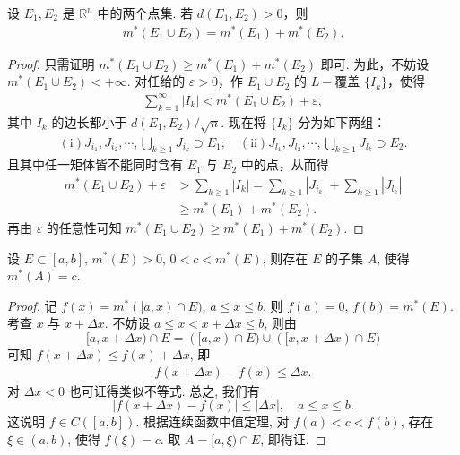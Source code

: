 \documentclass[../../main.tex]{subfiles}
\begin{document}
\begin{theorem}
设 \(E_1, E_2\) 是 \(\mathbb{R}^n\) 中的两个点集. 若 \(d(E_1, E_2)>0\)，则
\begin{align*}
m^*(E_1 \cup E_2) = m^*(E_1) + m^*(E_2).
\end{align*}
\end{theorem}
\begin{proof}
只需证明 \(m^*(E_1 \cup E_2) \geq m^*(E_1) + m^*(E_2)\) 即可. 为此，不妨设 \(m^*(E_1 \cup E_2)< + \infty\). 对任给的 \(\varepsilon > 0\)，作 \(E_1 \cup E_2\) 的 \(L -\)覆盖 \(\{I_k\}\)，使得
\begin{align*}
\sum_{k = 1}^{\infty} |I_k| < m^*(E_1 \cup E_2) + \varepsilon,
\end{align*}
其中 \(I_k\) 的边长都小于 \(d(E_1, E_2)/\sqrt{n}\). 现在将 \(\{I_k\}\) 分为如下两组：
\begin{align*}
(\text{i})J_{i_1}, J_{i_2}, \cdots,\bigcup_{k \geq 1} J_{i_k} \supset E_1 ; \quad (\text{ii})J_{l_1}, J_{l_2}, \cdots,\bigcup_{k \geq 1} J_{l_k} \supset E_2.
\end{align*}
且其中任一矩体皆不能同时含有 \(E_1\) 与 \(E_2\) 中的点，从而得
\begin{align*}
m^*(E_1 \cup E_2) + \varepsilon &> \sum_{k \geq 1} |I_k| = \sum_{k \geq 1} |J_{i_k}| + \sum_{k \geq 1} |J_{l_k}| \\
&\geq m^*(E_1) + m^*(E_2).
\end{align*}
再由 \(\varepsilon\) 的任意性可知 \(m^*(E_1 \cup E_2) \geq m^*(E_1) + m^*(E_2)\). 
\end{proof}

\begin{proposition}
设 \(E \subset [a,b]\), \(m^*(E)>0\), \(0 < c < m^*(E)\), 则存在 \(E\) 的子集 \(A\), 使得 \(m^*(A)=c\).
\end{proposition}
\begin{proof}
记 \(f(x)=m^*([a,x) \cap E)\), \(a \leq x \leq b\), 则 \(f(a)=0\), \(f(b)=m^*(E)\). 考查 \(x\) 与 \(x + \Delta x\). 不妨设 \(a \leq x < x + \Delta x \leq b\), 则由
\[
[a,x + \Delta x) \cap E = ([a,x) \cap E) \cup ([x,x + \Delta x) \cap E)
\]
可知 \(f(x + \Delta x) \leq f(x) + \Delta x\), 即
\begin{align*}
f(x + \Delta x) - f(x) \leq \Delta x.
\end{align*}
对 \(\Delta x < 0\) 也可证得类似不等式. 总之, 我们有
\[
|f(x + \Delta x) - f(x)| \leq |\Delta x|, \quad a \leq x \leq b.
\]
这说明 \(f \in C([a,b])\). 根据连续函数中值定理, 对 \(f(a) < c < f(b)\), 存在 \(\xi \in (a,b)\), 使得 \(f(\xi)=c\). 取 \(A = [a,\xi) \cap E\), 即得证.
\end{proof}
\end{document}
